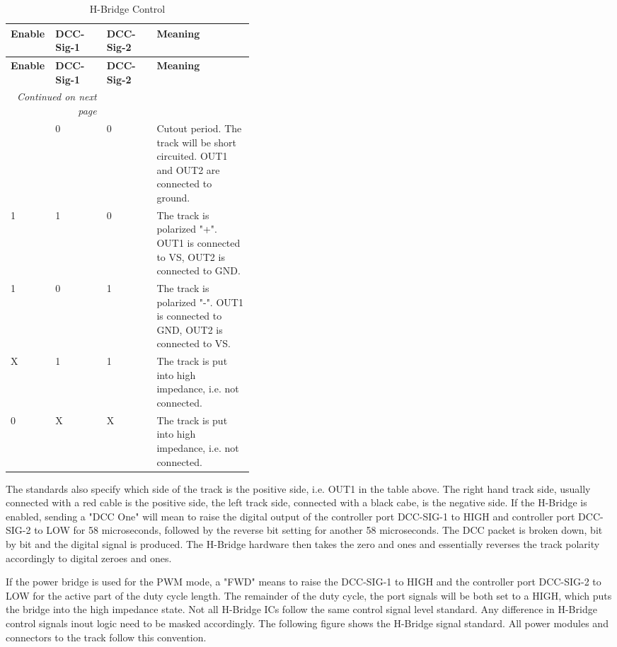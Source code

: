 \begin{longtable}{@{}|l|l|l|p{0.4\linewidth}|@{}}
    \caption{H-Bridge Control} \\
    \toprule
    \textbf{Enable} & \textbf{DCC-Sig-1} & \textbf{DCC-Sig-2} & \textbf{Meaning} \\
    \midrule
    \endfirsthead
    \toprule
    \textbf{Enable} & \textbf{DCC-Sig-1} & \textbf{DCC-Sig-2} & \textbf{Meaning} \\
    \midrule
    \endhead
    \midrule
    \multicolumn{2}{r}{\textit{Continued on next page}} \\
    \midrule
    \endfoot
    \bottomrule
    \endlastfoot
    1 & 0 & 0 & Cutout period. The track will be short circuited. OUT1 and OUT2 are connected to ground. \\
    \midrule
    1 & 1 & 0 & The track is polarized "+". OUT1 is connected to VS, OUT2 is connected to GND. \\
    \midrule
    1 & 0 & 1 & The track is polarized "-". OUT1 is connected to GND, OUT2 is connected to VS. \\
    \midrule
    X & 1 & 1 & The track is put into high impedance, i.e. not connected. \\
    \midrule
    0 & X & X & The track is put into high impedance, i.e. not connected. \\
\end{longtable}

The standards also specify which side of the track is the positive side, i.e. OUT1 in the table above. The right hand track side, usually connected with a red cable is the positive side, the left track side, connected with a black cabe, is the negative side. If the H-Bridge is enabled, sending a "DCC One" will mean to raise the digital output of the controller port DCC-SIG-1 to HIGH and controller port DCC-SIG-2 to LOW for 58 microseconds, followed by the reverse bit setting for another 58 microseconds. The DCC packet is broken down, bit by bit and the digital signal is produced. The H-Bridge hardware then takes the zero and ones and essentially reverses the track polarity accordingly to digital zeroes and ones.

If the power bridge is used for the PWM mode, a "FWD" means to raise  the DCC-SIG-1 to HIGH and the controller port DCC-SIG-2 to LOW for the active part of the duty cycle length. The remainder of the duty cycle, the port signals will be both set to a HIGH, which puts the bridge into the high impedance state. Not all H-Bridge ICs follow the same control signal level standard. Any difference in H-Bridge control signals inout logic need to be masked accordingly. The following figure shows the H-Bridge signal standard. All power modules and connectors to the track follow this convention.

